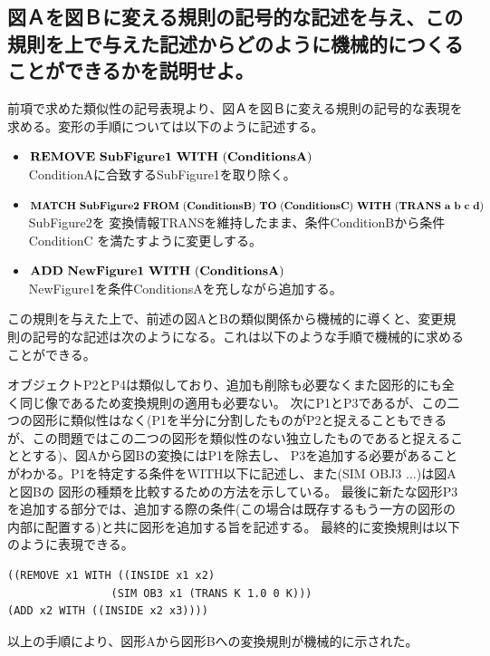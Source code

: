 \documentclass[uplatex]{jsarticle}
\begin{document}
\subsection{図Ａを図Ｂに変える規則の記号的な記述を与え、この規則を上で与えた記述からどのように機械的につくることができるかを説明せよ。}
前項で求めた類似性の記号表現より、図Ａを図Ｂに変える規則の記号的な表現を求める。変形の手順については以下のように記述する。
\begin{itemize}
  \item $\bf{REMOVE\ SubFigure1\ WITH\ (ConditionsA)}$  \\ ConditionAに合致するSubFigure1を取り除く。
  \item $\bf{MATCH\ SubFigure2\ FROM\ (ConditionsB)}\ TO\ (ConditionsC)\ WITH\ (TRANS\ a\ b\ c\ d)$  \\ SubFigure2を  変換情報TRANSを維持したまま、条件ConditionBから条件ConditionC
  を満たすように変更しする。
  \item $\bf{ADD\ NewFigure1\ WITH\ (ConditionsA)}$  \\  NewFigure1を条件ConditionsAを充しながら追加する。
\end{itemize}
この規則を与えた上で、前述の図AとBの類似関係から機械的に導くと、変更規則の記号的な記述は次のようになる。これは以下のような手順で機械的に求めることができる。

オブジェクトP2とP4は類似しており、追加も削除も必要なくまた図形的にも全く同じ像であるため変換規則の適用も必要ない。
次にP1とP3であるが、この二つの図形に類似性はなく(P1を半分に分割したものがP2と捉えることもできるが、この問題ではこの二つの図形を類似性のない独立したものであると捉えることとする)、図Aから図Bの変換にはP1を除去し、
P3を追加する必要があることがわかる。P1を特定する条件をWITH以下に記述し、また(SIM OBJ3 ...)は図Aと図Bの
図形の種類を比較するための方法を示している。
最後に新たな図形P3を追加する部分では、追加する際の条件(この場合は既存するもう一方の図形の内部に配置する)と共に図形を追加する旨を記述する。
最終的に変換規則は以下のように表現できる。
\begin{lstlisting}[basicstyle=\ttfamily\footnotesize, frame=single]
((REMOVE x1 WITH ((INSIDE x1 x2)
                (SIM OB3 x1 (TRANS K 1.0 0 K)))
(ADD x2 WITH ((INSIDE x2 x3))))
\end{lstlisting}
以上の手順により、図形Aから図形Bへの変換規則が機械的に示された。
\end{document}
